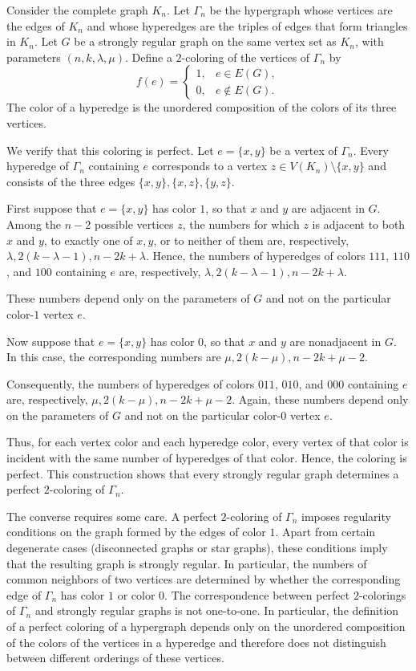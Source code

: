 \documentclass[11pt]{article}
\theoremstyle{definition}
\begin{document}
{{{Consider the complete graph $K_n$. Let $\Gamma_n$ be the hypergraph whose vertices are the edges of $K_n$ and whose hyperedges are the triples of edges that form triangles in $K_n$. Let $G$ be a strongly regular graph on the same vertex set as $K_n$, with parameters $(n,k,\lambda,\mu)$. Define a $2$-coloring of the vertices of $\Gamma_n$ by
$$
f(e)=
\begin{cases}
1,& e\in E(G),\\
0,& e\notin E(G).
\end{cases}
$$
The color of a hyperedge is the unordered composition of the colors of its three vertices.

We verify that this coloring is perfect. Let $e=\{x,y\}$ be a vertex of $\Gamma_n$. Every hyperedge of $\Gamma_n$ containing $e$ corresponds to a vertex $z\in V(K_n)\setminus \{x,y\}$ and consists of the three edges
$\{x,y\}, \{x,z\}, \{y,z\}$.

First suppose that $e=\{x,y\}$ has color $1$, so that $x$ and $y$ are adjacent in $G$. Among the $n-2$ possible vertices $z$, the numbers for which $z$ is adjacent to both $x$ and $y$, to exactly one of $x,y$, or to neither of them are, respectively,
$\lambda, 2(k-\lambda-1), n-2k+\lambda$.
Hence, the numbers of hyperedges of colors $111$, $110$, and $100$ containing $e$ are, respectively,
$\lambda, 2(k-\lambda-1), n-2k+\lambda$.

These numbers depend only on the parameters of $G$ and not on the particular color-$1$ vertex $e$.

Now suppose that $e=\{x,y\}$ has color $0$, so that $x$ and $y$ are nonadjacent in $G$. In this case, the corresponding numbers are
$\mu, 2(k-\mu), n-2k+\mu-2$.

Consequently, the numbers of hyperedges of colors $011$, $010$, and $000$ containing $e$ are, respectively,
$\mu, 2(k-\mu), n-2k+\mu-2$.
Again, these numbers depend only on the parameters of $G$ and not on the particular color-$0$ vertex $e$.

Thus, for each vertex color and each hyperedge color, every vertex of that color is incident with the same number of hyperedges of that color. Hence, the coloring is perfect.
This construction shows that every strongly regular graph determines a perfect $2$-coloring of $\Gamma_n$.

The converse requires some care. A perfect $2$-coloring of $\Gamma_n$ imposes regularity conditions on the graph formed by the edges of color $1$. Apart from certain degenerate cases (disconnected graphs or 
star graphs), these conditions imply that the resulting graph is strongly regular. In particular, the numbers of common neighbors of two vertices are determined by whether the corresponding edge of $\Gamma_n$ has color $1$ or color $0$.
The correspondence between perfect $2$-colorings of $\Gamma_n$ and strongly regular graphs is not one-to-one. In particular, the definition of a perfect coloring of a hypergraph depends only on the unordered composition of the colors of the vertices in a hyperedge and therefore does not distinguish between different orderings of these vertices.





}}}
\end{document}
